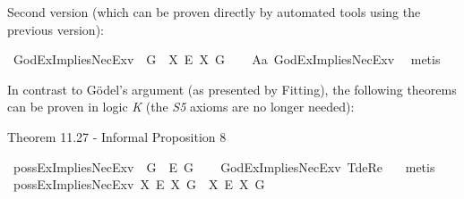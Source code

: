 \begin{isabellebody}
\isamarkupfalse%
%
%
%
%
\begin{isamarkuptext}%
Second version (which can be proven directly by automated tools using the previous version):%
\end{isamarkuptext}\isamarkuptrue%
\isamarkupfalse%
\ GodExImpliesNecEx{\isacharunderscore}v{}{\isacharcolon}\ {\isachardoublequoteopen}{\isasymlfloor}\isactrlbold {\isasymexists}\ \isactrlbold {\isasymdown}G\ \isactrlbold {\isasymrightarrow}\ {\isacharparenleft}{\isacharparenleft}{\isasymlambda}X{\isachardot}\ \isactrlbold {\isasymbox}\isactrlbold {\isasymexists}\isactrlsup E\ X{\isacharparenright}\ \isactrlbold {\isasymdown}G{\isacharparenright}{\isasymrfloor}{\isachardoublequoteclose}\isanewline
%
\ \ %
%
\isamarkupfalse%
\ A{}a\ GodExImpliesNecEx{\isacharunderscore}v{}\ \isamarkupfalse%
\ metis%
%
%
%
\begin{isamarkuptext}%
In contrast to G\"odel's argument (as presented by Fitting), the following theorems can be proven in logic \emph{K}
 (the \emph{S5} axioms are no longer needed):%
\end{isamarkuptext}\isamarkuptrue%
%
\begin{isamarkuptext}%
Theorem 11.27 - Informal Proposition 8%
\end{isamarkuptext}\isamarkuptrue%
\isamarkupfalse%
\ possExImpliesNecEx{\isacharunderscore}v{}{\isacharcolon}\ {\isachardoublequoteopen}{\isasymlfloor}\isactrlbold {\isasymdiamond}\isactrlbold {\isasymexists}\ \isactrlbold {\isasymdown}G\ \isactrlbold {\isasymrightarrow}\ \isactrlbold {\isasymbox}\isactrlbold {\isasymexists}\isactrlsup E\ \isactrlbold {\isasymdown}G{\isasymrfloor}{\isachardoublequoteclose}\isanewline
%
\ \ %
%
\isamarkupfalse%
\ GodExImpliesNecEx{\isacharunderscore}v{}\ T{}{\isacharunderscore}deRe\ \ \isamarkupfalse%
\ metis%
%
\isanewline
%
\isamarkupfalse%
\ possExImpliesNecEx{\isacharunderscore}v{}{\isacharcolon}\ {\isachardoublequoteopen}{\isasymlfloor}{\isacharparenleft}{\isasymlambda}X{\isachardot}\ \isactrlbold {\isasymdiamond}\isactrlbold {\isasymexists}\isactrlsup E\ X{\isacharparenright}\ \isactrlbold {\isasymdown}G\ \isactrlbold {\isasymrightarrow}\ {\isacharparenleft}{\isacharparenleft}{\isasymlambda}X{\isachardot}\ \isactrlbold {\isasymbox}\isactrlbold {\isasymexists}\isactrlsup E\ X{\isacharparenright}\ \isactrlbold {\isasymdown}G{\isacharparenright}{\isasymrfloor}{\isachardoublequoteclose}\isanewline

\end{isabellebody}
